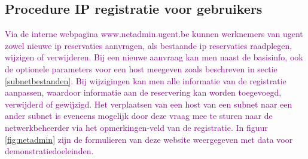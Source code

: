 \subsection{Procedure IP registratie voor gebruikers}
\textcolor{purple}{Via de interne webpagina www.netadmin.ugent.be kunnen werknemers van \acrshort{ugent} zowel nieuwe \acrshort{ip} reservaties aanvragen, als bestaande \acrshort{ip} reservaties raadplegen, wijzigen of verwijderen. Bij een nieuwe aanvraag kan men naast de basisinfo, ook de optionele parameters voor een host meegeven zoals beschreven in sectie \ref{subnetbestanden}. Bij wijzigingen kan men alle informatie van de registratie aanpassen, waardoor informatie aan de reservering kan worden toegevoegd, verwijderd of gewijzigd. Het verplaatsen van een host van een subnet naar een ander subnet is eveneens mogelijk door deze vraag mee te sturen naar de netwerkbeheerder via het opmerkingen-veld van de registratie. In figuur \ref{fig:netadmin} zijn de formulieren van deze website weergegeven met data voor demonstratiedoeleinden.
}
\clearpage
{}


